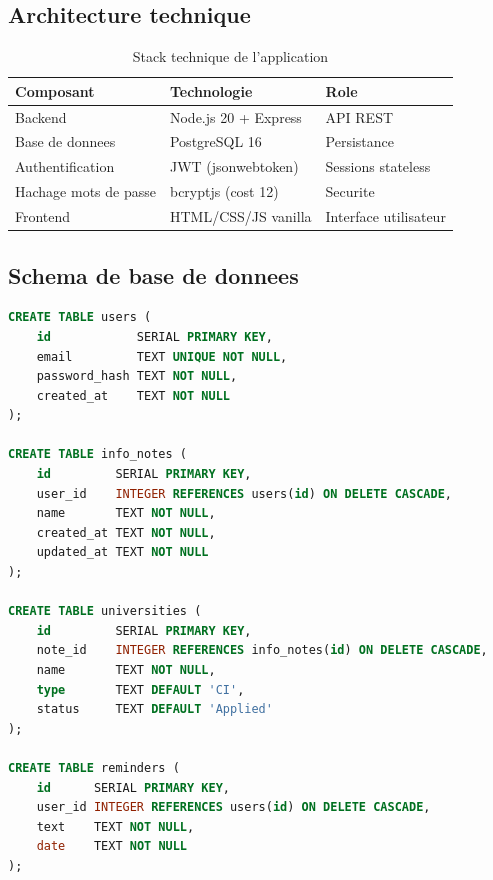 \documentclass[12pt,a4paper,french]{report}
\begin{document}
\subsection{Architecture technique}

\begin{table}[H]
    \centering
    \begin{tabular}{|l|l|l|}
        \hline
        \textbf{Composant} & \textbf{Technologie} & \textbf{Role} \\
        \hline
        Backend & Node.js 20 + Express & API REST \\
        Base de donnees & PostgreSQL 16 & Persistance \\
        Authentification & JWT (jsonwebtoken) & Sessions stateless \\
        Hachage mots de passe & bcryptjs (cost 12) & Securite \\
        Frontend & HTML/CSS/JS vanilla & Interface utilisateur \\
        \hline
    \end{tabular}
    \caption{Stack technique de l'application}
    \label{table:stack}
\end{table}

\subsection{Schema de base de donnees}

\begin{lstlisting}[language=SQL, caption=Schema PostgreSQL (simplifie)]
CREATE TABLE users (
    id            SERIAL PRIMARY KEY,
    email         TEXT UNIQUE NOT NULL,
    password_hash TEXT NOT NULL,
    created_at    TEXT NOT NULL
);

CREATE TABLE info_notes (
    id         SERIAL PRIMARY KEY,
    user_id    INTEGER REFERENCES users(id) ON DELETE CASCADE,
    name       TEXT NOT NULL,
    created_at TEXT NOT NULL,
    updated_at TEXT NOT NULL
);

CREATE TABLE universities (
    id         SERIAL PRIMARY KEY,
    note_id    INTEGER REFERENCES info_notes(id) ON DELETE CASCADE,
    name       TEXT NOT NULL,
    type       TEXT DEFAULT 'CI',
    status     TEXT DEFAULT 'Applied'
);

CREATE TABLE reminders (
    id      SERIAL PRIMARY KEY,
    user_id INTEGER REFERENCES users(id) ON DELETE CASCADE,
    text    TEXT NOT NULL,
    date    TEXT NOT NULL
);
\end{lstlisting}
\end{document}
